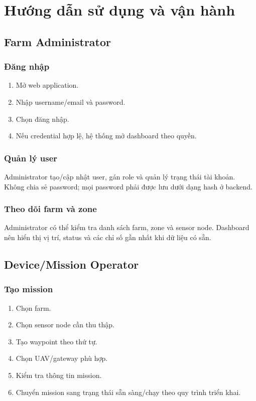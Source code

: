 
\chapter{Hướng dẫn sử dụng và vận hành}

\section{Farm Administrator}
\subsection{Đăng nhập}
\begin{enumerate}
  \item Mở web application.
  \item Nhập username/email và password.
  \item Chọn đăng nhập.
  \item Nếu credential hợp lệ, hệ thống mở dashboard theo quyền.
\end{enumerate}

\subsection{Quản lý user}
Administrator tạo/cập nhật user, gán role và quản lý trạng thái tài khoản. Không chia sẻ password; mọi password phải được lưu dưới dạng hash ở backend.

\subsection{Theo dõi farm và zone}
Administrator có thể kiểm tra danh sách farm, zone và sensor node. Dashboard nên hiển thị vị trí, status và các chỉ số gần nhất khi dữ liệu có sẵn.

\section{Device/Mission Operator}
\subsection{Tạo mission}
\begin{enumerate}
  \item Chọn farm.
  \item Chọn sensor node cần thu thập.
  \item Tạo waypoint theo thứ tự.
  \item Chọn UAV/gateway phù hợp.
  \item Kiểm tra thông tin mission.
  \item Chuyển mission sang trạng thái sẵn sàng/chạy theo quy trình triển khai.
\end{enumerate}


